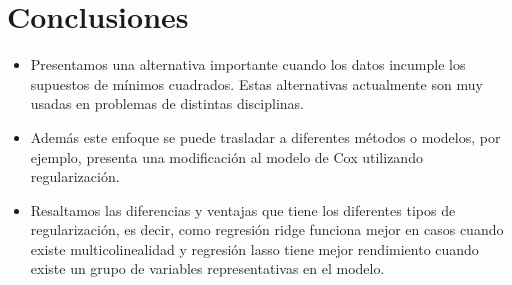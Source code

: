 \section{Conclusiones}
\begin{frame}
\begin{itemize}[<+- | alert@+>]
    \item Presentamos una alternativa importante cuando los datos incumple los supuestos de mínimos cuadrados. Estas alternativas actualmente son muy usadas en problemas de distintas disciplinas. 
    \item Además este enfoque se puede trasladar a diferentes métodos o modelos, por ejemplo, \cite{cox_lasso} presenta una modificación al modelo de Cox utilizando regularización.  
    \item Resaltamos las diferencias y ventajas que tiene los diferentes tipos de regularización, es decir, como regresión ridge funciona mejor en casos cuando existe multicolinealidad y regresión lasso tiene mejor rendimiento cuando existe un grupo de variables representativas en el modelo. 
\end{itemize}
    
\end{frame}

\printbibliography





